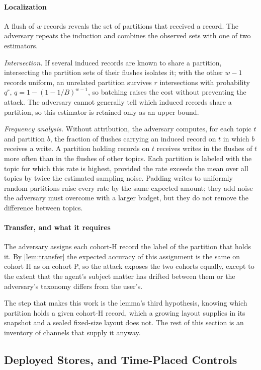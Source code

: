 \paragraph{Localization}
A flush of $w$ records reveals the set of partitions that received a record. The adversary repeats
the induction and combines the observed sets with one of two estimators.

\emph{Intersection.} If several induced records are known to share a partition, intersecting the
partition sets of their flushes isolates it; with the other $w-1$ records uniform, an unrelated
partition survives $r$ intersections with probability $q^r$, $q = 1 - (1 - 1/B)^{w-1}$, so batching
raises the cost without preventing the attack. The adversary cannot generally tell which induced
records share a partition, so this estimator is retained only as an upper bound.

\emph{Frequency analysis.} Without attribution, the adversary computes, for each topic $t$ and
partition $b$, the fraction of flushes carrying an induced record on $t$ in which $b$ receives a
write. A partition holding records on $t$ receives writes in the flushes of $t$ more often than in
the flushes of other topics. Each partition is labeled with the topic for which this rate is
highest, provided the rate exceeds the mean over all topics by twice the estimated sampling noise.
Padding writes to uniformly random partitions raise every rate by the same expected amount; they
add noise the adversary must overcome with a larger budget, but they do not remove the difference
between topics.

\paragraph{Transfer, and what it requires}
The adversary assigns each cohort-H record the label of the partition that holds it. By
\cref{lem:transfer} the expected accuracy of this assignment is the same on cohort H as on cohort
P, so the attack exposes the two cohorts equally, except to the extent that the agent's subject
matter has drifted between them or the adversary's taxonomy differs from the user's.

The step that makes this work is the lemma's third hypothesis, knowing which partition holds a
given cohort-H record, which a growing layout supplies in its snapshot and a sealed fixed-size
layout does not. The rest of this section is an inventory of channels that supply it anyway.

\subsection{Deployed Stores, and Time-Placed Controls}
\label{sec:transfer-general}

